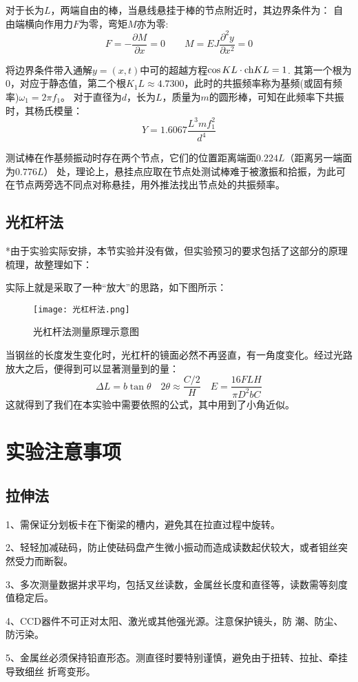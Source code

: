 \documentclass[11pt]{article}
\begin{document}
对于长为$L$，两端自由的棒，当悬线悬挂于棒的节点附近时，其边界条件为：
自由端横向作用力$F$为零，弯矩$M$亦为零:
\[
   F=-\frac{\partial M}{\partial x} =0\qquad 
   M=EJ\frac{\partial^2y}{\partial x^2}=0
\]

将边界条件带入通解$y=(x,t)$中可的超越方程$\cos KL\cdot {\rm ch}KL=1$.
其第一个根为$0$，对应于静态值，第二个根$K_1L\approx 4.7300$，此时的共振频率称为基频(或固有频率)$\omega_1=2\pi f_1$。
对于直径为$d$，长为$L$，质量为$m$的圆形棒，可知在此频率下共振时，其杨氏模量：
\[
   Y=1.6067\frac{L^3mf_1^2}{d^4} 
\]

测试棒在作基频振动时存在两个节点，它们的位置距离端面$0.224L $（距离另一端面为$0.776L$）
处，理论上，悬挂点应取在节点处测试棒难于被激振和拾振，为此可在节点两旁选不同点对称悬挂，用外推法找出节点处的共振频率。

\subsection{光杠杆法}
*由于实验实际安排，本节实验并没有做，但实验预习的要求包括了这部分的原理梳理，故整理如下：

实际上就是采取了一种“放大”的思路，如下图所示：
\begin{figure}[H]
    \centering
    \texttt{[image: 光杠杆法.png]}
    \caption{光杠杆法测量原理示意图}
\end{figure}
当钢丝的长度发生变化时，光杠杆的镜面必然不再竖直，有一角度变化。经过光路放大之后，便得到可以显著测量到的量：
\[
    \Delta L=b\tan \theta\quad 2\theta \approx \frac{C/2}{H}
    \quad E=\frac{16FLH}{\pi D^2bC}
\]
这就得到了我们在本实验中需要依照的公式，其中用到了小角近似。

\section{实验注意事项}
\subsection{拉伸法}
1、需保证分划板卡在下衡梁的槽内，避免其在拉直过程中旋转。

2、轻轻加减砝码，防止使砝码盘产生微小振动而造成读数起伏较大，或者钼丝突然受力而断裂。

3、多次测量数据并求平均，包括叉丝读数，金属丝长度和直径等，读数需等刻度值稳定后。

4、CCD器件不可正对太阳、激光或其他强光源。注意保护镜头，防
潮、防尘、防污染。

5、金属丝必须保持铅直形态。测直径时要特别谨慎，避免由于扭转、拉扯、牵挂导致细丝
折弯变形。
\end{document}
